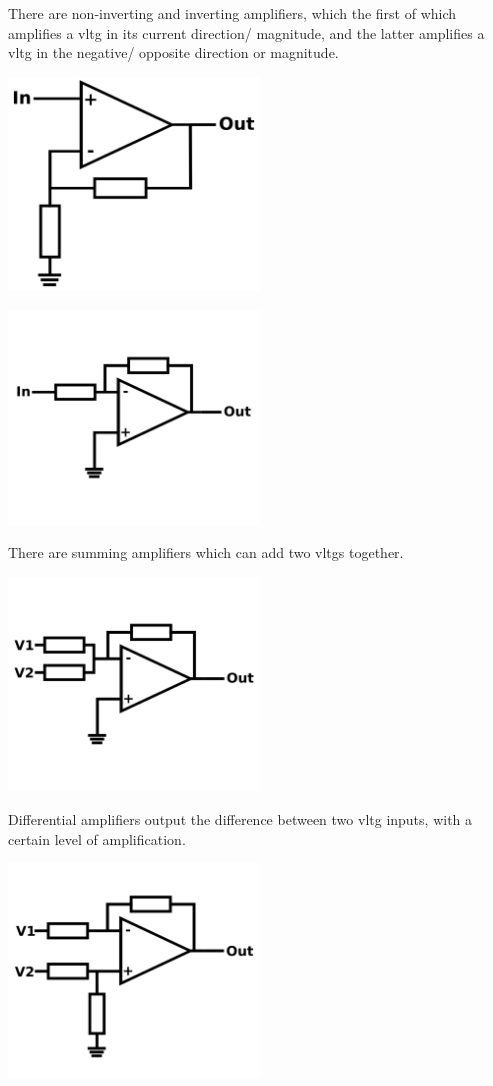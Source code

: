 \documentclass[a4paper,11pt]{report}
\begin{document}
There are non-inverting and inverting amplifiers, which the first of which amplifies a \gls{vltg} in its current direction/ magnitude, and the latter amplifies a \gls{vltg} in the negative/ opposite direction or magnitude.

\includegraphics[width=0.5\textwidth]{noninvertingamp}

\includegraphics[width=0.5\textwidth]{invertingamp}

There are summing amplifiers which can add two \gls{vltg}s together.

\includegraphics[width=0.5\textwidth]{summingamp}

Differential amplifiers output the difference between two \gls{vltg} inputs, with a certain level of amplification.

\includegraphics[width=0.5\textwidth]{differentialamp}
\end{document}
